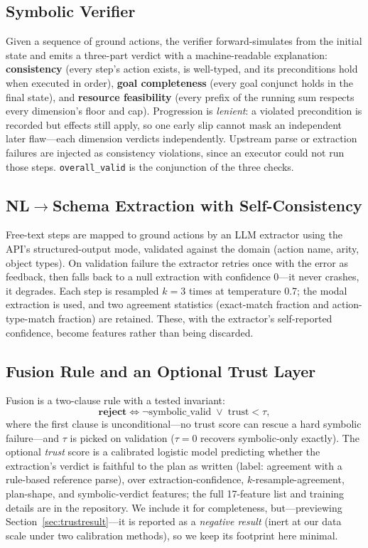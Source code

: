\documentclass[letterpaper]{article}
\begin{document}
\subsection{Symbolic Verifier}

Given a sequence of ground actions, the verifier forward-simulates from the
initial state and emits a three-part verdict with a machine-readable
explanation:
\textbf{consistency} (every step's action exists, is well-typed, and its
preconditions hold when executed in order), \textbf{goal completeness}
(every goal conjunct holds in the final state), and \textbf{resource
feasibility} (every prefix of the running sum respects every dimension's
floor and cap). Progression is \emph{lenient}: a violated precondition is
recorded but effects still apply, so one early slip cannot mask an
independent later flaw---each dimension verdicts independently. Upstream
parse or extraction failures are injected as consistency violations, since an
executor could not run those steps. \texttt{overall\_valid} is the
conjunction of the three checks.

\subsection{NL$\to$Schema Extraction with Self-Consistency}

Free-text steps are mapped to ground actions by an LLM extractor using the
API's structured-output mode, validated against the domain (action name,
arity, object types). On validation failure the extractor retries once with
the error as feedback, then falls back to a null extraction with confidence
$0$---it never crashes, it degrades. Each step is resampled $k{=}3$ times at
temperature 0.7; the modal extraction is used, and two agreement statistics
(exact-match fraction and action-type-match fraction) are retained. These,
with the extractor's self-reported confidence, become features rather than
being discarded.

\subsection{Fusion Rule and an Optional Trust Layer}
\label{sec:trust}

Fusion is a two-clause rule with a tested invariant:
\[
\textbf{reject} \iff \neg\text{symbolic\_valid} \;\lor\; \text{trust} < \tau,
\]
where the first clause is unconditional---no trust score can rescue a hard
symbolic failure---and $\tau$ is picked on validation ($\tau{=}0$ recovers
symbolic-only exactly). The optional \emph{trust} score is a calibrated
logistic model predicting whether the extraction's verdict is faithful to
the plan as written (label: agreement with a rule-based reference parse),
over extraction-confidence, $k$-resample-agreement, plan-shape, and
symbolic-verdict features; the full 17-feature list and training details are
in the repository. We include it for completeness, but---previewing
Section~\ref{sec:trustresult}---it is reported as a \emph{negative result}
(inert at our data scale under two calibration methods), so we keep its
footprint here minimal.
\end{document}
